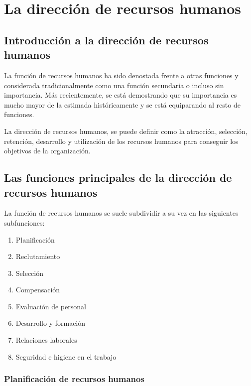 \documentclass[10pt,a4paper,spanish]{report}
\begin{document}
\chapter{\textcolor[rgb]{0.8,0.2,0.8}La dirección de recursos humanos}

      \section{\textcolor[rgb]{0.8,0.2,0.8}Introducción a la dirección de recursos humanos}

            La función de recursos humanos ha sido denostada frente a otras funciones y considerada tradicionalmente como una función secundaria o incluso sin importancia. Más recientemente, se está demostrando que su importancia es mucho mayor de la estimada históricamente y se está equiparando al resto de funciones.

            La dirección de recursos humanos, se puede definir como la atracción, selección, retención, desarrollo y utilización de los recursos humanos para conseguir los objetivos de la organización.

      \section{\textcolor[rgb]{0.8,0.2,0.8}Las funciones principales de la dirección de recursos humanos}

            La función de recursos humanos se suele subdividir a su vez en las siguientes subfunciones:
            \begin{enumerate}
                  \item Planificación
                  \item Reclutamiento
                  \item Selección
                  \item Compensación
                  \item Evaluación de personal
                  \item Desarrollo y formación
                  \item Relaciones laborales
                  \item Seguridad e higiene en el trabajo
            \end{enumerate}

            \subsection{\textcolor[rgb]{0.8,0.2,0.8}Planificación de recursos humanos}
\end{document}

